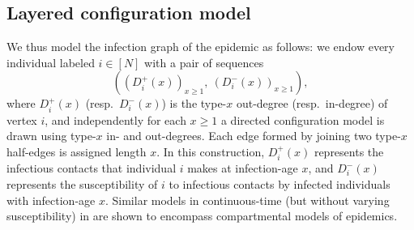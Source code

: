 \begin{refsegment}
\subsection*{Layered configuration model}
We thus model the infection graph of the epidemic as
follows: we endow every individual labeled $i\in[N]$ with a pair of sequences\\
\[
((D_{i}^{+}(x))_{x\geq 1},\ (D_{i}^{-}(x))_{x\geq 1}),
\]
 where $D^+_i(x)$
(resp.\ $D^-_i(x)$) is the type-$x$ out-degree (resp.\ in-degree) of
vertex $i$, and independently for each $x\geq 1$ a directed
configuration model is drawn using type-$x$ in- and out-degrees. Each
edge formed by joining two type-$x$ half-edges is assigned length $x$.
In this construction, $D^+_i(x)$ represents the infectious contacts
that individual $i$ makes at infection-age $x$, and $D^-_i(x)$
represents the susceptibility of $i$ to infectious contacts by
infected individuals with infection-age $x$. Similar models in
continuous-time (but without varying susceptibility) in
\cite{duchamps_general_2023} are shown to encompass compartmental
models of epidemics.


\end{refsegment}
